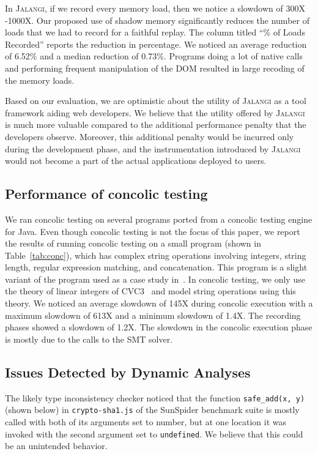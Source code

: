 \documentclass{sig-alternate}
\def\jalangi{\textsc{Jalangi}}
\begin{document}
In \jalangi{}, if we record every memory load, then we notice a
slowdown of 300X -1000X.  Our proposed use of shadow memory
significantly reduces the number of loads that we had to record for a
faithful replay.  The column titled ``\% of Loads Recorded'' reports
the reduction in percentage.  We noticed an average reduction of
6.52\% and a median reduction of 0.73\%.  Programs doing a lot of
native calls and performing frequent manipulation of the DOM resulted
in large recoding of the memory loads.

Based on our evaluation, we are optimistic about the utility of
\jalangi{} as a tool framework aiding web developers.  We believe that
the utility offered by \jalangi{} is much more valuable compared to
the additional performance penalty that the developers
observe. Moreover, this additional penalty would be incurred only
during the development phase, and the instrumentation introduced by
\jalangi{} would not become a part of the actual applications deployed
to users.

\subsection{Performance of concolic testing}
\label{sec:conc-test-small}

We ran concolic testing on several programs ported from a concolic
testing engine for Java.  Even though concolic testing is not the
focus of this paper, we report the results of running concolic testing
on a small program (shown in Table~\ref{tab:conc}), which has complex
string operations involving integers, string length, regular
expression matching, and concatenation.  This program is a slight
variant of the program used as a case study
in~\cite{Bjorner:2009:PFA:1532891.1532927}.  In concolic testing, we
only use the theory of linear integers of CVC3~\cite{BT07} and model
string operations using this theory.  We noticed an average slowdown
of 145X during concolic execution with a maximum slowdown of 613X and
a minimum slowdown of 1.4X.  The recording phases showed a slowdown of
1.2X.  The slowdown in the concolic execution phase is mostly due to
the calls to the SMT solver.

\subsection{Issues Detected by Dynamic Analyses}
\label{sec:issu-detect-dynam}

The likely type inconsistency checker noticed that the function
\texttt{safe\_add(x, y)} (shown below) in \texttt{crypto-sha1.js} of the SunSpider
benchmark suite is mostly called with both of its arguments set to number,
but at one location it was invoked with the second argument set to
\texttt{undefined}.   We believe that this could be an unintended
behavior.   
\end{document}
